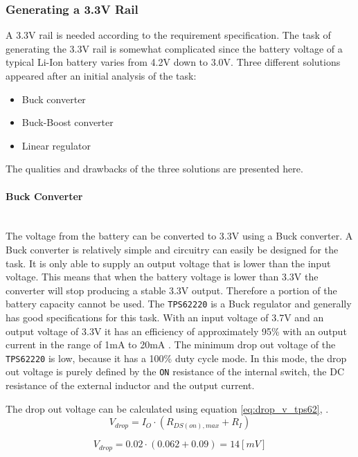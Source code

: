 \subsubsection{Generating a 3.3V Rail}
A 3.3V rail is needed according to the requirement specification.
The task of generating the 3.3V rail is somewhat complicated since the battery voltage of a typical Li-Ion battery varies from 4.2V down to 3.0V.
Three different solutions appeared after an initial analysis of the task:

\begin{itemize}
	\item Buck converter
	\item Buck-Boost converter
	\item Linear regulator
\end{itemize}

The qualities and drawbacks of the three solutions are presented here.

\paragraph{Buck Converter}~\\
The voltage from the battery can be converted to 3.3V using a Buck converter.
A Buck converter is relatively simple and circuitry can easily be designed for the task.
It is only able to supply an output voltage that is lower than the input voltage.
This means that when the battery voltage is lower than 3.3V the converter will stop producing a stable 3.3V output.
Therefore a portion of the battery capacity cannot be used.
The \texttt{TPS62220} is a Buck regulator and generally has good specifications for this task. 
With an input voltage of 3.7V and an output voltage of 3.3V it has an efficiency of approximately 95\% with an output current in the range of 1mA to 20mA \cite{TPS6222}.
The minimum drop out voltage of the \texttt{TPS62220} is low, because it has a 100\% duty cycle mode.
In this mode, the drop out voltage is purely defined by the \texttt{ON} resistance of the internal switch, the DC resistance of the external inductor and the output current.

The drop out voltage can be calculated using equation \ref{eq:drop_v_tps62}, \cite{TPS6222}.
\begin{equation}
	V_{drop} = I_{O} \cdot (R_{DS(on),max}+R_I)
	\label{eq:drop_v_tps62}
\end{equation}

\begin{equation}
	V_{drop} = 0.02 \cdot (0.062+0.09) = 14 [mV]
	\label{eq:drop_v_tps62_2}
\end{equation}

